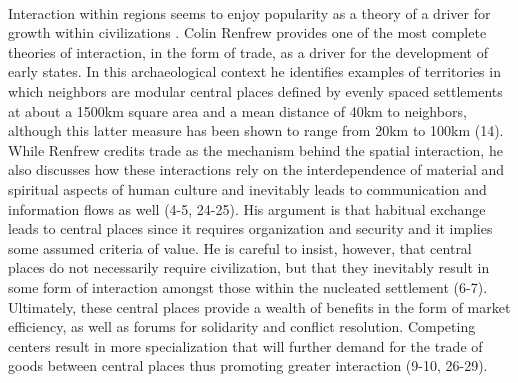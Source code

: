 \documentclass[12pt,a4paper]{thesis}
\begin{document}
\paragraph{}
Interaction within regions seems to enjoy popularity as a theory of a driver for growth within civilizations \citetext{\citealp[226]{Kow08}; \citealp[380]{Bin83}}. Colin Renfrew \citeyearpar{Ren75} provides one of the most complete theories of interaction, in the form of trade, as a driver for the development of early states.  In this archaeological context he identifies examples of territories in which neighbors are modular central places defined  by evenly spaced settlements at about a 1500km square area and a mean distance of 40km to neighbors, although this latter measure has been shown to range from 20km to 100km (14). While Renfrew credits trade as the mechanism behind the spatial interaction, he also discusses how these interactions rely on the interdependence of material and spiritual aspects of human culture and inevitably leads to communication and information flows as well (4-5, 24-25). His argument is that habitual exchange leads to central places since it requires organization and security and it implies some assumed criteria of value. He is careful to insist, however, that central places do not necessarily require civilization, but that they inevitably result in some form of interaction amongst those within the nucleated settlement (6-7). Ultimately, these central places provide a wealth of benefits in the form of market efficiency, as well as forums for solidarity and conflict resolution.  Competing centers result in more specialization that will further demand for the trade of goods between central places thus promoting greater interaction (9-10, 26-29).
\end{document}
